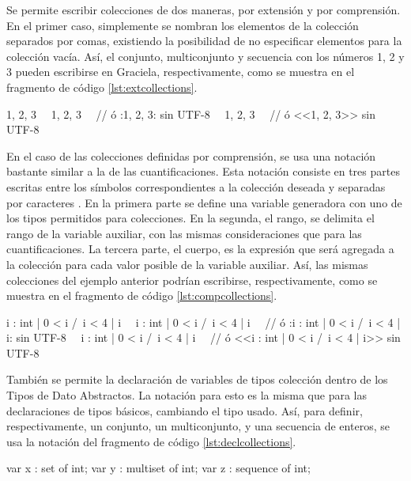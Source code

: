 Se permite escribir colecciones de dos maneras, por extensión y por comprensión.
En el primer caso, simplemente se nombran los elementos de la colección
separados por comas, existiendo la posibilidad de no especificar elementos para
la colección vacía. Así, el conjunto, multiconjunto y secuencia con los números
1, 2 y 3 pueden escribirse en Graciela, respectivamente, como se muestra en el
fragmento de código \ref{lst:extcollections}.

\begin{gracielacode}[caption=Expresiones de tipos \textit{colección} por extensión, label=lst:extcollections]
{1, 2, 3}
~\Lbag~1, 2, 3~\Rbag~ // ó {:1, 2, 3:} sin UTF-8
~\Lseq~1, 2, 3~\Rseq~ // ó <<1, 2, 3>> sin UTF-8
\end{gracielacode}

En el caso de las colecciones definidas por comprensión, se usa una notación
bastante similar a la de las cuantificaciones. Esta notación consiste en tres
partes escritas entre los símbolos correspondientes a la colección deseada y
separadas por caracteres \ingra{|}. En la primera parte se define una variable
generadora con uno de los tipos permitidos para colecciones. En la segunda, el
rango, se delimita el rango de la variable auxiliar, con las mismas
consideraciones que para las cuantificaciones. La tercera parte, el cuerpo, es
la expresión que será agregada a la colección para cada valor posible de la
variable auxiliar. Así, las mismas colecciones del ejemplo anterior podrían
escribirse, respectivamente, como se muestra en el
fragmento de código \ref{lst:compcollections}.

\begin{gracielacode}[caption=Expresiones de tipos \textit{colección} por comprensión, label=lst:compcollections]
{i : int | 0 < i /\ i < 4 | i}
~\Lbag~i : int | 0 < i /\ i < 4 | i~\Rbag~
  // ó {:i : int | 0 < i /\ i < 4 | i:} sin UTF-8
~\Lseq~i : int | 0 < i /\ i < 4 | i~\Rseq~
  // ó <<i : int | 0 < i /\ i < 4 | i>> sin UTF-8
\end{gracielacode}

También se permite la declaración de variables de tipos colección dentro de los
Tipos de Dato Abstractos. La notación para esto es la misma que para las
declaraciones de tipos básicos, cambiando el tipo usado. Así, para definir,
respectivamente, un conjunto, un multiconjunto, y una secuencia de enteros, se
usa la notación del fragmento de código \ref{lst:declcollections}.

\begin{gracielacode}[caption=Declaración de variables de tipos \textit{colección}, label=lst:declcollections]
var x : set of int;
var y : multiset of int;
var z : sequence of int;
\end{gracielacode}

